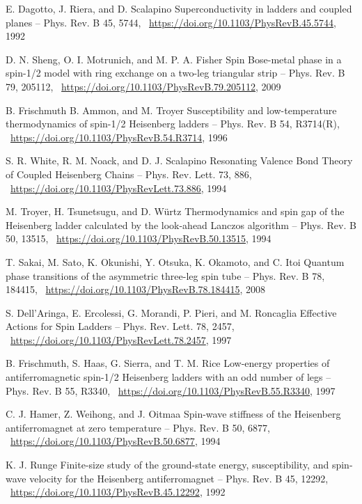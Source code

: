 \documentclass[11pt]{article}
\begin{document}
\begin{thebibliography}{3}
E. Dagotto, J. Riera, and D. Scalapino Superconductivity in ladders and coupled planes -- Phys. Rev. B 45, 5744,  ~\url{https://doi.org/10.1103/PhysRevB.45.5744}, 1992

D. N. Sheng, O. I. Motrunich, and M. P. A. Fisher Spin Bose-metal phase in a spin-1/2 model with ring exchange on a two-leg triangular strip -- Phys. Rev. B 79, 205112,  ~\url{https://doi.org/10.1103/PhysRevB.79.205112}, 2009

B. Frischmuth B. Ammon, and M. Troyer Susceptibility and low-temperature thermodynamics of spin-1/2 Heisenberg ladders -- Phys. Rev. B 54, R3714(R),  ~\url{https://doi.org/10.1103/PhysRevB.54.R3714}, 1996

S. R. White, R. M. Noack, and D. J. Scalapino Resonating Valence Bond Theory of Coupled Heisenberg Chains -- Phys. Rev. Lett. 73, 886, ~\url{https://doi.org/10.1103/PhysRevLett.73.886}, 1994

M. Troyer, H. Tsunetsugu, and D. Würtz Thermodynamics and spin gap of the Heisenberg ladder calculated by the look-ahead Lanczos algorithm -- Phys. Rev. B 50, 13515,  ~\url{https://doi.org/10.1103/PhysRevB.50.13515}, 1994

T. Sakai, M. Sato, K. Okunishi, Y. Otsuka, K. Okamoto, and C. Itoi Quantum phase transitions of the asymmetric three-leg spin tube -- Phys. Rev. B 78, 184415,  ~\url{https://doi.org/10.1103/PhysRevB.78.184415}, 2008

S. Dell’Aringa, E. Ercolessi, G. Morandi, P. Pieri, and M. Roncaglia Effective Actions for Spin Ladders -- Phys. Rev. Lett. 78, 2457,  ~\url{https://doi.org/10.1103/PhysRevLett.78.2457}, 1997

B. Frischmuth, S. Haas, G. Sierra, and T. M. Rice Low-energy properties of antiferromagnetic spin-1/2 Heisenberg ladders with an odd number of legs -- Phys. Rev. B 55, R3340, ~\url{https://doi.org/10.1103/PhysRevB.55.R3340},  1997

C. J. Hamer, Z. Weihong, and J. Oitmaa Spin-wave stiffness of the Heisenberg antiferromagnet at zero temperature -- Phys. Rev. B 50, 6877,  ~\url{https://doi.org/10.1103/PhysRevB.50.6877}, 1994

K. J. Runge Finite-size study of the ground-state energy, susceptibility, and spin-wave velocity for the Heisenberg antiferromagnet -- Phys. Rev. B 45, 12292,  ~\url{https://doi.org/10.1103/PhysRevB.45.12292}, 1992


\end{thebibliography}
\end{document}
